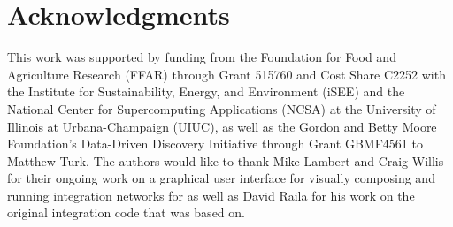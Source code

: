 \documentclass[journal]{IEEEtran}
\newcommand{\todo}[1]{{\color{red}{#1}}}
\newcommand{\pkg}{{\tt \todo{cis\_interface}}{}}
\begin{document}

\section*{Acknowledgments}
\ifieee
\else
\acknowledgments
\fi
%
This work was supported by funding from the Foundation for Food and Agriculture Research (FFAR) through Grant 515760 and Cost Share C2252 with the Institute for Sustainability, Energy, and Environment (iSEE) and the National Center for Supercomputing Applications (NCSA) at the University of Illinois at Urbana-Champaign (UIUC), as well as the Gordon and Betty Moore Foundation's Data-Driven Discovery Initiative through Grant GBMF4561 to Matthew Turk. 
%
The authors would like to thank Mike Lambert and Craig Willis for their ongoing work on a graphical user interface for visually composing and running integration networks for {\pkg} as well as David Raila for his work on the original integration code that {\pkg} was based on.

\ifdraft
	
\else
	
\fi
\end{document}

